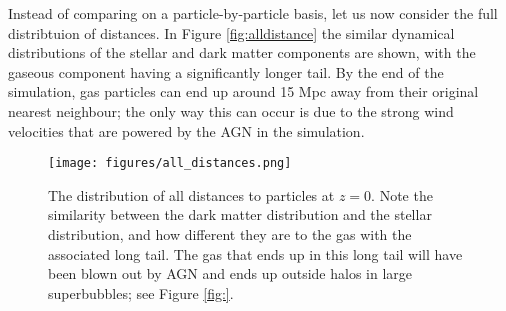 Instead of comparing on a particle-by-particle basis, let us now consider the full distribtuion of distances. In Figure \ref{fig:alldistance} the similar dynamical distributions of the stellar and dark matter components are shown, with the gaseous component having a significantly longer tail. By the end of the simulation, gas particles can end up around 15 Mpc away from their original nearest neighbour; the only way this can occur is due to the strong wind velocities that are powered by the AGN in the simulation.

\begin{figure}
    \centering
    \texttt{[image: figures/all\_distances.png]}
    \caption{The distribution of all distances to particles at $z=0$. Note the similarity between the dark matter distribution and the stellar distribution, and how different they are to the gas with the associated long tail. The gas that ends up in this long tail will have been blown out by AGN and ends up outside halos in large superbubbles; see Figure \ref{fig:}.}
    \label{fig:alldistances}
\end{figure}

